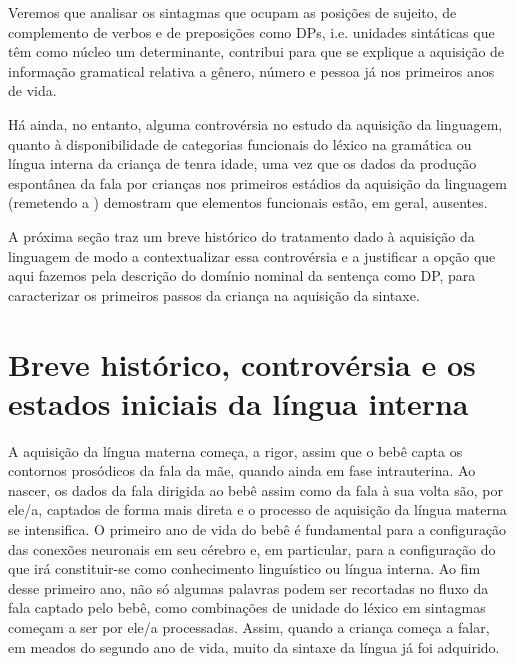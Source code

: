 \documentclass[output=paper]{LSP/langsci}
\begin{document}
Veremos que analisar os sintagmas que ocupam as posições de sujeito, de complemento de verbos e de preposições como DPs, i.e. unidades sintáticas que têm como núcleo um determinante, contribui para que se explique a aquisição de informação gramatical relativa a gênero, número e pessoa já nos primeiros anos de vida. 

Há ainda, no entanto, alguma controvérsia no estudo da aquisição da linguagem, quanto à disponibilidade de categorias funcionais do léxico na gramática ou língua interna da criança de tenra idade, uma vez que os dados da produção espontânea da fala por crianças nos primeiros estádios da aquisição da linguagem (remetendo a \citealt{brown1973}) demostram que elementos funcionais estão, em geral, ausentes. 

A próxima seção traz um breve histórico do tratamento dado à aquisição da linguagem de modo a contextualizar essa controvérsia e a justificar a opção que aqui fazemos pela descrição do domínio nominal da sentença como DP, para caracterizar os primeiros passos da criança na aquisição da sintaxe. 

\section{Breve histórico, controvérsia e os estados iniciais da língua interna}
\label{sec:correanp_breve}

A aquisição da língua materna começa, a rigor, assim que o bebê capta os contornos prosódicos da fala da mãe, quando ainda em fase intrauterina. Ao nascer, os dados da fala dirigida ao bebê assim como da fala à sua volta são, por ele/a, captados de forma mais direta e o processo de aquisição da língua materna se intensifica. O primeiro ano de vida do bebê é fundamental para a configuração das conexões neuronais em seu cérebro e, em particular, para a configuração do que irá constituir-se como conhecimento linguístico ou língua interna. Ao fim desse primeiro ano, não só algumas palavras podem ser recortadas no fluxo da fala captado pelo bebê, como combinações de unidade do léxico em sintagmas começam a ser por ele/a processadas. Assim, quando a criança começa a falar, em meados do segundo ano de vida, muito da sintaxe da língua já foi adquirido. 
\end{document}
